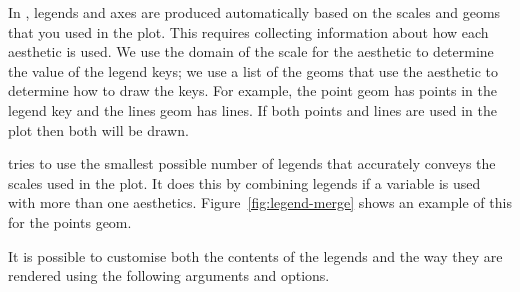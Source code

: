 In \ggplot, legends and axes are produced automatically based on the scales and geoms that you used in the plot. This requires collecting information about how each aesthetic is used. We use the domain of the scale for the aesthetic to determine the value of the legend keys; we use a list of the geoms that use the aesthetic to determine how to draw the keys. For example, the point geom has points in the legend key and the lines geom has lines. If both points and lines are used in the plot then both will be drawn.

\ggplot tries to use the smallest possible number of legends that accurately conveys the scales used in the plot.  It does this by combining legends if a variable is used with more than one aesthetics.  Figure~\ref{fig:legend-merge} shows an example of this for the points geom.  


% 


It is possible to customise both the contents of the legends and the way they are rendered using the following arguments and options.

